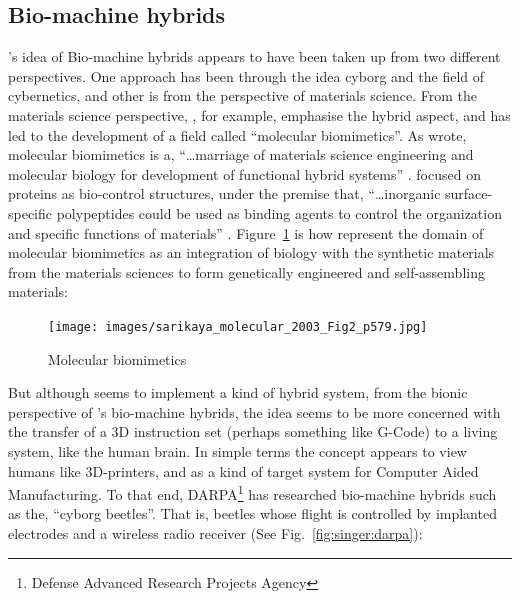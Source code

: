 \subsection{Bio-machine hybrids}

\citeauthor{schmitt_signals_1963}'s idea of Bio-machine hybrids appears to have been taken up from two different perspectives. One approach has been through the idea cyborg and the field of cybernetics, and other is from the perspective of materials science. From the materials science perspective,  \citeauthor{schmitt_signals_1963}, for example, emphasise the hybrid aspect, and has led to the development of a field called ``molecular biomimetics''. As \citeauthor{sarikaya_molecular_2003} wrote,  molecular biomimetics is a, ``\dots marriage of materials science engineering and molecular biology for development of functional hybrid systems'' \cite[p.~579]{sarikaya_molecular_2003}. \citeauthor{sarikaya_molecular_2003} focused on proteins as bio-control structures, under the premise that, ``\dots inorganic surface-specific polypeptides could be used as binding agents to control the organization and specific functions of materials'' \cite[p.~578]{sarikaya_molecular_2003}. Figure~\ref{fig:sarikaya:molecular} is how \citeauthor{sarikaya_molecular_2003} represent the domain of molecular biomimetics as an integration of biology with the synthetic materials from the materials sciences to form genetically engineered and self-assembling materials:

\begin{figure}[H]
    \centering
    \texttt{[image: images/sarikaya\_molecular\_2003\_Fig2\_p579.jpg]}
    \caption{Molecular biomimetics \cite[Fig.~2, p.~579]{sarikaya_molecular_2003}}
    \label{fig:sarikaya:molecular}
\end{figure}

But although \citeauthor{sarikaya_molecular_2003} seems to implement a kind of hybrid system, from the bionic perspective of \citeauthor{schmitt_signals_1963}'s bio-machine hybrids, the idea seems to be more concerned with the transfer of a 3D instruction set (perhaps something like G-Code) to a living system, like the human brain. In simple terms the concept appears to view humans like 3D-printers, and as a kind of target system for Computer Aided Manufacturing. To that end, DARPA\footnote{Defense Advanced Research Projects Agency} has researched bio-machine hybrids such as the, ``cyborg beetles''. That is, beetles whose flight is controlled by implanted electrodes and a wireless radio receiver \citep{singer_army_2009} (See Fig.~\ref{fig:singer:darpa}):  

